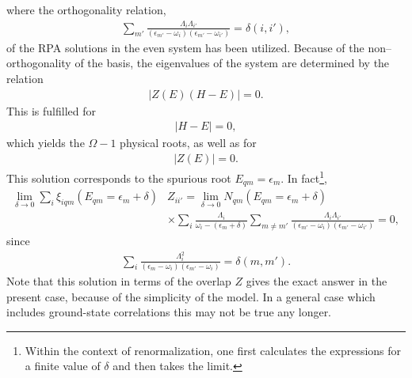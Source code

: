 where the orthogonality relation,
\begin{align}\label{eqC1A68} 
 \sum_{m'}\frac{\Lambda_i\Lambda_{i'}}{(\epsilon_{m'}-\omega_i)(\epsilon_{m'}-\omega_{i'})}=\delta(i,i'),
  \end{align}
of the RPA solutions in the even system has been utilized. Because of the non--orthogonality of the basis, the eigenvalues of the system are determined 
by the relation
\begin{align}\label{eqC1A69} 
 \left|Z(E)(H-E)\right|=0.
  \end{align}
This is fulfilled for 
\begin{align}\label{eqC1A70} 
 \left|H-E\right|=0,
  \end{align}
  which yields the $\Omega-1$ physical roots, as well as for 
\begin{align}\label{eqC1A71} 
 |Z(E)|=0.
  \end{align}
This solution corresponds to the spurious root $E_{qm}=\epsilon_m$. In fact\footnote{Within the context of renormalization, one first calculates the expressions  for a finite value of $\delta$ and then takes the limit.}, 
\begin{align}\label{eqC1A72} 
\nonumber \lim_{\delta\rightarrow0}\sum_i\xi_{iqm}(E_{qm}=\epsilon_m+\delta)&Z_{ii'}=\lim_{\delta\rightarrow0}N_{qm}(E_{qm}=\epsilon_m+\delta)\\
 &\times\sum_i\frac{\Lambda_i}{\omega_i-(\epsilon_m+\delta)}\sum_{m\neq m'}\frac{\Lambda_i\Lambda_{i'}}{(\epsilon_{m'}-\omega_i)(\epsilon_{m'}-\omega_{i'})}=0,
  \end{align}
  since
  \begin{align}\label{eqC1A72b} 
  \sum_i\frac{\Lambda_i^2}{(\epsilon_{m}-\omega_i)(\epsilon_{m'}-\omega_{i})}=\delta(m,m').
    \end{align} 
Note that this solution in terms of the overlap $Z$ gives the exact answer in the present case, because of the simplicity of the model. In a general case which includes ground-state correlations this may not be true any longer. 



